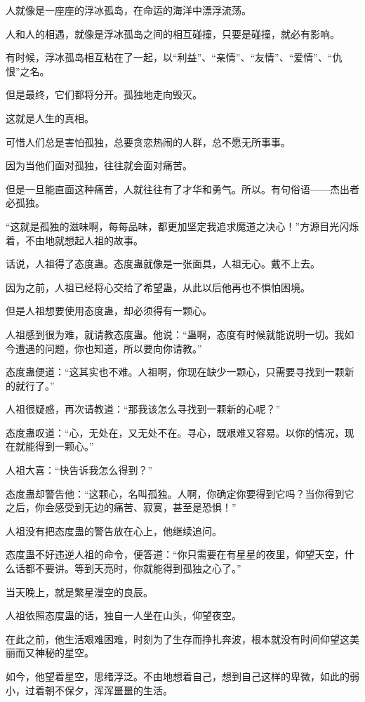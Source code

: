 \begin{this_body}
人就像是一座座的浮冰孤岛，在命运的海洋中漂浮流荡。

人和人的相遇，就像是浮冰孤岛之间的相互碰撞，只要是碰撞，就必有影响。

有时候，浮冰孤岛相互粘在了一起，以“利益”、“亲情”、“友情”、“爱情”、“仇恨”之名。

但是最终，它们都将分开。孤独地走向毁灭。

这就是人生的真相。

可惜人们总是害怕孤独，总要贪恋热闹的人群，总不愿无所事事。

因为当他们面对孤独，往往就会面对痛苦。

但是一旦能直面这种痛苦，人就往往有了才华和勇气。所以。有句俗语——杰出者必孤独。

“这就是孤独的滋味啊，每每品味，都更加坚定我追求魔道之决心！”方源目光闪烁着，不由地就想起人祖的故事。

话说，人祖得了态度蛊。态度蛊就像是一张面具，人祖无心。戴不上去。

因为之前，人祖已经将心交给了希望蛊，从此以后他再也不惧怕困境。

但是人祖想要使用态度蛊，却必须得有一颗心。

人祖感到很为难，就请教态度蛊。他说：“蛊啊，态度有时候就能说明一切。我如今遭遇的问题，你也知道，所以要向你请教。”

态度蛊便道：“这其实也不难。人祖啊，你现在缺少一颗心，只需要寻找到一颗新的就行了。”

人祖很疑惑，再次请教道：“那我该怎么寻找到一颗新的心呢？”

态度蛊叹道：“心，无处在，又无处不在。寻心，既艰难又容易。以你的情况，现在就能得到一颗心。”

人祖大喜：“快告诉我怎么得到？”

态度蛊却警告他：“这颗心，名叫孤独。人啊，你确定你要得到它吗？当你得到它之后，你会感受到无边的痛苦、寂寞，甚至是恐惧！”

人祖没有把态度蛊的警告放在心上，他继续追问。

态度蛊不好违逆人祖的命令，便答道：“你只需要在有星星的夜里，仰望天空，什么话都不要讲。等到天亮时，你就能得到孤独之心了。”

当天晚上，就是繁星漫空的良辰。

人祖依照态度蛊的话，独自一人坐在山头，仰望夜空。

在此之前，他生活艰难困难，时刻为了生存而挣扎奔波，根本就没有时间仰望这美丽而又神秘的星空。

如今，他望着星空，思绪浮泛。不由地想着自己，想到自己这样的卑微，如此的弱小，过着朝不保夕，浑浑噩噩的生活。


\end{this_body}
